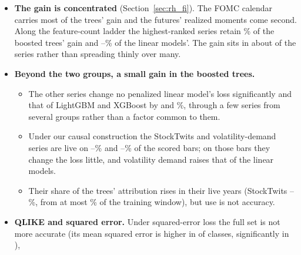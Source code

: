 \begin{itemize}
\item \textbf{The gain is concentrated} (Section~\ref{sec:rh_fi}). The FOMC calendar
  carries most of the trees' gain and the futures' realized moments come second. Along the feature-count ladder the
  \ladderEBTopK{} highest-ranked series retain \ladderEBTreeRetainRng{}\% of the boosted trees' gain and
  \rhldEBLinRTenMin{}--\rhldEBLinRTenMax{}\% of the linear models'. The gain sits in about \ladderEBTopK{} of the
  \rhldEBNSeries{} series rather than spreading thinly over many.
\item \textbf{Beyond the two groups, a small gain in the boosted trees.}
  \begin{itemize}
  \item The other \rhbyFLNSeries{} series change no penalized linear model's loss significantly and that of
    LightGBM and XGBoost by \rhabLgbmFullVsAddRmFomcAllPct{} and \rhabXgbFullVsAddRmFomcAllPct\%, through a few
    series from several groups rather than a factor common to them.
  \item Under our causal construction the StockTwits and volatility-demand series are live on
    \rhlvStSentEvLo--\rhlvStAttEvHi\% and \rhlvVdEvLo--\rhlvVdEvHi\% of the scored bars; on those bars they change the
    loss little, and volatility demand raises that of the linear models.
  \item Their share of the trees' attribution rises in their live years (StockTwits
    \rhfilStwLiveMin--\rhfilStwLiveMax\%, from at most \rhfilStwWinPct\% of the training window), but use is not
    accuracy.
  \end{itemize}
\item \textbf{QLIKE and squared error.} Under squared-error loss the full set is not more accurate (its mean squared
  error is higher in \rhcaNMseHigherBarSpan{} of \rhorAfPairs{} classes, significantly in \rhcaNMseHigherSigBarSpan),

\end{itemize}
